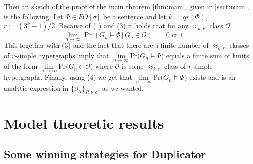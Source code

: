 \documentclass[12pt,notitlepage,a4paper]{article}
\theoremstyle{definition}
\newcommand{\Ln}{\lim\limits_{n\to \infty}}
\newcommand{\PR}[1]{\mathrm{Pr}\big(#1\big)}
\begin{document}
Then an sketch of the proof of the main theorem \cref{thm:main}, given in \cref{sect:main},
 is the following:
Let $\Phi\in FO[\sigma]$ be a sentence and let $k:=qr(\Phi)$, $r:=(3^k-1)/2$.
Because of (1) and (3) it holds that for any $\approx_{k,r}$ class $\mathcal{O}$
\[
\Ln \Pr\left(G_n \models \Phi\, \big| \, G_n\in \mathcal{O} \right)= \text{ $0$ or $1$ }.
\]
This together with (3) and the fact that there are a finite number of
$\approx_{k,r}$-classes of $r$-simple hypergraphs imply that $\Ln \PR{G_n \models \Phi}$
equals a finite sum of limits of the form $\Ln \PR{G_n \in \mathcal{O}}$
where $\mathcal{O}$ is some $\approx_{k,r}$-class of $r$-simple hypergraphs.
Finally, using (4) we get that $\Ln \PR{G_n \models \Phi}$ exists and 
is an analytic expression in $\{\beta_R\}_{R\in \sigma}$, as we wanted. 
%
%
%

\section{Model theoretic results}

\subsection{Some winning strategies for Duplicator}
\end{document}
